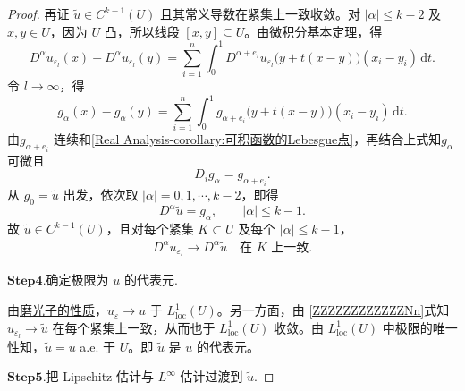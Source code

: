 \documentclass[../../main.tex]{subfiles}
\begin{document}
\begin{proof}
再证 \(\widetilde u\in C^{k-1}(U)\) 且其常义导数在紧集上一致收敛。对 \(|\alpha|\leqslant k-2\) 及 \(x,y\in U\)，因为 \(U\) 凸，所以线段 \([x,y]\subseteq U\)。由微积分基本定理，得
\[
D^\alpha u_{\varepsilon_l}(x)-D^\alpha u_{\varepsilon_l}(y)
=
\sum_{i=1}^n
\int_0^1
D^{\alpha+e_i}u_{\varepsilon_l}\bigl(y+t(x-y)\bigr)(x_i-y_i)
\,\mathrm{d}t.
\]
令 \(l\to\infty\)，得
\[
g_\alpha(x)-g_\alpha(y)
=
\sum_{i=1}^n
\int_0^1
g_{\alpha+e_i}\bigl(y+t(x-y)\bigr)(x_i-y_i)
\,\mathrm{d}t.
\]
由\(g_{\alpha+e_i}\) 连续和\cref{Real Analysis-corollary:可积函数的Lebesgue点}，再结合上式知\(g_\alpha\)可微且
\[
D_i g_\alpha=g_{\alpha+e_i}.
\]
从 \(g_0=\widetilde u\) 出发，依次取 \(|\alpha|=0,1,\cdots,k-2\)，即得
\[
D^\alpha\widetilde u=g_\alpha,
\qquad
|\alpha|\leqslant k-1.
\]
故 \(\widetilde u\in C^{k-1}(U)\)，且对每个紧集 \(K\subset U\) 及每个 \(|\alpha|\leqslant k-1\)，
\begin{align}
D^\alpha u_{\varepsilon_l}\longrightarrow D^\alpha\widetilde u
\quad\text{在 }K\text{ 上一致}.\label{ZZZZZZZZZZZZNn}
\end{align}

\noindent$\mathbf{Step}\bm{4}$.{\heiti 确定极限为 \(u\) 的代表元.}

由\hyperref[theorem:appC-光滑算子的性质]{磨光子的性质}，\(u_\varepsilon\to u\) 于 \(L^1_{\mathrm{loc}}(U)\)。另一方面，由 \eqref{ZZZZZZZZZZZZNn}式知 \(u_{\varepsilon_l}\to\widetilde u\) 在每个紧集上一致，从而也于 \(L^1_{\mathrm{loc}}(U)\) 收敛。由 \(L^1_{\mathrm{loc}}(U)\) 中极限的唯一性知，\(\widetilde u=u\) a.e. 于 \(U\)。即 \(\widetilde u\) 是 \(u\) 的代表元。

\noindent$\mathbf{Step}\bm{5}$.{\heiti 把 Lipschitz 估计与 \(L^\infty\) 估计过渡到 \(\widetilde u\).}


\end{proof}
\end{document}
